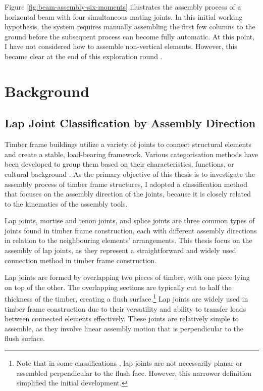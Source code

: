 \FloatBarrier

Figure \ref{fig:beam-assembly-six-moments} illustrates the assembly process of a horizontal beam with four simultaneous mating joints. In this initial working hypothesis, the system requires manually assembling the first few columns to the ground before the subsequent process can become fully automatic. At this point, I have not considered how to assemble non-vertical elements. However, this became clear at the end of this exploration round .


\section{Background}
\label{section:exploration-1-background}

\subsection{Lap Joint Classification by Assembly Direction}
\label{subsection:exploration-1-lap-joint-classification-by-assembly-direction}

Timber frame buildings utilize a variety of joints to connect structural elements and create a stable, load-bearing framework. Various categorisation methods have been developed to group them based on their characteristics, functions, or cultural background . As the primary objective of this thesis is to investigate the assembly process of timber frame structures, I adopted a classification method that focuses on the assembly direction of the joints, because it is closely related to the kinematics of the assembly tools.

Lap joints, mortise and tenon joints, and splice joints are three common types of joints found in timber frame construction, each with different assembly directions in relation to the neighbouring elements' arrangements. This thesis focus on the assembly of lap joints, as they represent a straightforward and widely used connection method in timber frame construction.

Lap joints are formed by overlapping two pieces of timber, with one piece lying on top of the other. The overlapping sections are typically cut to half the thickness of the timber, creating a flush surface.\footnote{Note that in some classifications \parencite{seikeArtJapaneseJoinery1977}, lap joints are not necessarily planar or assembled perpendicular to the flush face. However, this narrower definition simplified the initial development.} Lap joints are widely used in timber frame construction due to their versatility and ability to transfer loads between connected elements effectively. These joints are relatively simple to assemble, as they involve linear assembly motion that is perpendicular to the flush surface.

